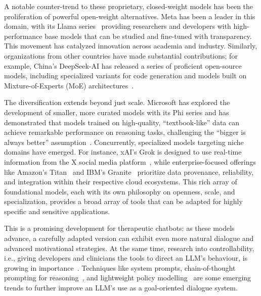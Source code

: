 A notable counter-trend to these proprietary, closed-weight models has been the proliferation of powerful open-weight alternatives. Meta has been a leader in this domain, with its Llama series~\cite{touvron2023llama} providing researchers and developers with high-performance base models that can be studied and fine-tuned with transparency. This movement has catalyzed innovation across academia and industry. Similarly, organizations from other countries have made substantial contributions; for example, China's DeepSeek-AI has released a series of proficient open-source models, including specialized variants for code generation and models built on Mixture-of-Experts (MoE) architectures~\cite{deepseek2024deepseekv2}.

The diversification extends beyond just scale. Microsoft has explored the development of smaller, more curated models with its Phi series and has demonstrated that models trained on high-quality, ``textbook-like'' data can achieve remarkable performance on reasoning tasks, challenging the ``bigger is always better'' assumption~\cite{li2023textbooks}. Concurrently, specialized models targeting niche domains have emerged. For instance, xAI's Grok is designed to use real-time information from the X social media platform~\cite{xai2023grok}, while enterprise-focused offerings like Amazon's Titan~\cite{aws2023titan} and IBM's Granite~\cite{ibm2023granite} prioritize data provenance, reliability, and integration within their respective cloud ecosystems. This rich array of foundational models, each with its  own philosophy on openness, scale, and specialization, provides a broad array of tools that can be adapted for highly specific and sensitive applications.

This is a promising development for therapeutic chatbots: as these models advance, a carefully adapted version can exhibit even more natural dialogue and advanced motivational strategies. At the same time, research into controllability, i.e., giving developers and clinicians the tools to direct an LLM's behaviour, is growing in importance~\cite{fernandez-etal-2025-lamia}. Techniques like system prompts, chain-of-thought prompting for reasoning~\cite{10.5555/3600270.3602070}, and lightweight policy modelling~\cite{du-etal-2024-rewarding} are some emerging trends to further improve an LLM's use as a goal-oriented dialogue system.


